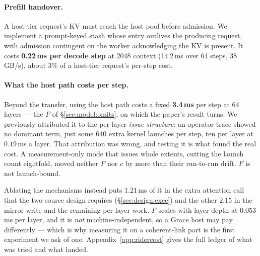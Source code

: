 \paragraph{Prefill handover.}
\label{sec:impl:stash}
A host-tier request's KV must reach the host pool before admission. We implement a
prompt-keyed stash whose entry outlives the producing request, with admission
contingent on the worker acknowledging the KV is present. It costs \textbf{0.22\,ms
per decode step} at 2048 context (14.2\,ms over 64 steps, 38\,GB/s), about 3\% of a
host-tier request's per-step cost.

\paragraph{What the host path costs per step.}
\label{sec:impl:cost}
Beyond the transfer, using the host path costs a fixed \textbf{3.4\,ms} per step at
64 layers --- the $F$ of \S\ref{sec:model:omits}, on which the paper's result turns.
We previously attributed it to the per-layer \emph{issue structure}: an operator
trace showed no dominant term, just some 640 extra kernel launches per step, ten per
layer at $0.19$\,ms a layer. That attribution was wrong, and testing it is what
found the real cost. A measurement-only mode that issues whole extents, cutting the
launch count eightfold, moved neither $F$ nor $c$ by more than their run-to-run
drift. $F$ is not launch-bound.

Ablating the mechanisms instead puts $1.21$\,ms of it in the extra attention call
that the two-source design requires (\S\ref{sec:design:exec}) and the other
$2.15$ in the mirror write and the remaining per-layer work. $F$ scales with layer
depth at $0.053$\,ms per layer, and it is \emph{not} machine-independent, so a Grace
host may pay differently --- which is why measuring it on a coherent-link part is
the first experiment we ask of one. Appendix~\ref{app:ridercost} gives the full
ledger of what was tried and what landed.
